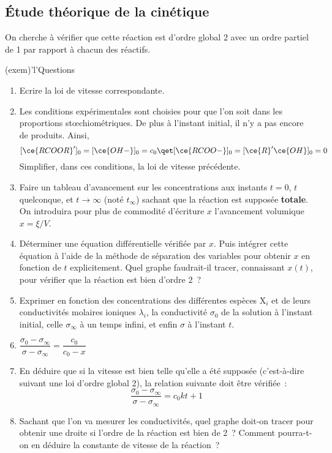\documentclass[../main/main.tex]{subfiles}
\begin{document}
\subsection{\'Etude théorique de la cinétique}

On cherche à vérifier que cette réaction est d'ordre global 2 avec un ordre
partiel de 1 par rapport à chacun des réactifs.

\begin{tcb}(exem)'l'{Questions}
	\begin{enumerate}[label=\sqenumi, start=4]
		\item Ecrire la loi de vitesse correspondante.
		\item Les conditions expérimentales sont choisies pour que l'on soit dans
		      les proportions stœchiométriques. De plus à l'instant initial, il n'y a
		      pas encore de produits. Ainsi,
		      \[[\ce{RCOOR}']_0 = [\ce{OH-}]_0 = c_0 \qet [\ce{RCOO-}]_0 =
			      [\ce{R}'\ce{OH}]_0 = 0\]
		      Simplifier, dans ces conditions, la loi de vitesse précédente.
		\item Faire un tableau d'avancement sur les concentrations aux instants $t =
			      0$, $t$ quelconque, et $t\to \infty$ (noté $t_\infty$) sachant que la
		      réaction est supposée \textbf{totale}. On introduira pour plus de
		      commodité d'écriture $x$ l'avancement volumique $x = \xi / V$.
		\item Déterminer une équation différentielle vérifiée par $x$. Puis intégrer
		      cette équation à l'aide de la méthode de séparation des variables pour
		      obtenir $x$ en fonction de $t$ explicitement. Quel graphe faudrait-il
		      tracer, connaissant $x(t)$, pour vérifier que la réaction est bien
		      d'ordre 2~?
		\item Exprimer en fonction des concentrations des différentes espèces X$_i$
		      et de leurs conductivités molaires ioniques $\lambda_i$, la
		      conductivité $\sigma_0$ de la solution à l'instant initial, celle
		      $\sigma_\infty$ à un temps infini, et enfin $\sigma$ à l'instant $t$.
		\item {}
		      {$\dfrac{\sigma_0-\sigma_\infty}{\sigma-\sigma_\infty} =
				      \dfrac{c_0}{c_0-x}$}
		\item En déduire que si la vitesse est bien telle qu'elle a été supposée
		      (c'est-à-dire suivant une loi d'ordre global 2), la relation suivante
		      doit être vérifiée~:
		      \[\dfrac{\sigma_0-\sigma_\infty}{\sigma-\sigma_\infty} = c_0 k t +1\]
		\item Sachant que l'on va mesurer les conductivités, quel graphe doit-on
		      tracer pour obtenir une droite si l'ordre de la réaction est bien de 2~?
		      Comment pourra-t-on en déduire la constante de vitesse de la réaction~?
	\end{enumerate}
\end{tcb}
\end{document}
